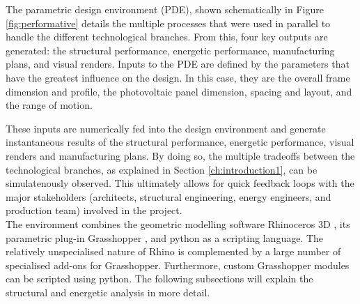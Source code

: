 
The parametric design environment (PDE), shown schematically in Figure \ref{fig:performative} details the multiple processes that were used in parallel to handle the different technological branches. From this, four key outputs are generated: the structural performance, energetic performance, manufacturing plans, and visual renders. Inputs to the PDE are defined by the parameters that have the greatest influence on the design. In this case, they are the overall frame dimension and profile, the photovoltaic panel dimension, spacing and layout, and the range of motion. 

These inputs are numerically fed into the design environment and generate instantaneous results of the structural performance, energetic performance, visual renders and manufacturing plans. By doing so, the multiple tradeoffs between the technological branches, as explained in Section \ref{ch:introduction1}, can be simulatenously observed. This ultimately allows for quick feedback loops with the major stakeholders (architects, structural engineering, energy engineers, and production team) involved in the project. \\




The environment combines the geometric modelling software Rhinoceros 3D \cite{Rhino}, its parametric plug-in Grasshopper \cite{grasshopper}, and python \cite{python} as a scripting language. The relatively unspecialised nature of Rhino is complemented by a large number of specialised add-ons for Grasshopper. Furthermore, custom Grasshopper modules can be scripted using python. The following subsections will explain the structural and energetic analysis in more detail.

